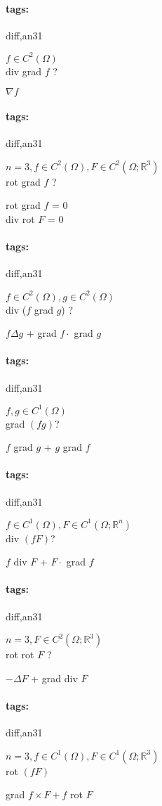 \documentclass[12pt]{article}
\newcommand*{\xfield}[1]{\begin{mdframed}\centering #1\end{mdframed}\bigskip}
\newenvironment{note}{}{}
\newcommand*{\tags}[1]{\paragraph{tags: }#1}
\begin{document}
\begin{note}
	\tags{diff,an3}1
	\xfield{$f \in C^2(\Omega)$  \\
	div grad $f$ ?}
	\xfield{$\nabla f$}
\end{note}

\begin{note}
	\tags{diff,an3}1
	\xfield{$n=3,f \in C^2(\Omega) , F \in C^2(\Omega;\mathbb{R}^3 )$ \\
	rot grad $f$ ?}
	\xfield{rot grad $f$ = 0 \\ 
	div rot $F$ = 0}
\end{note}

\begin{note}
	\tags{diff,an3}1
	\xfield{$f \in C^2(\Omega),g \in C^2(\Omega)$  \\
	div ($f$ grad $g$) ?}
	\xfield{$f\Delta g$ + grad $f \cdot$ grad $g$}
\end{note}

\begin{note}
	\tags{diff,an3}1
	\xfield{$f,g \in C^1(\Omega)$ \\
	grad $(fg)$?}
	\xfield{$f$ grad $g$ + $g$ grad $f$}
\end{note}

\begin{note}
	\tags{diff,an3}1
	\xfield{$f \in C^1(\Omega) , F \in C^1(\Omega;\mathbb{R}^n )$  \\
	div $(fF)$?}
	\xfield{$f$ div $F$ + $F \cdot$ grad $f$}
\end{note}

\begin{note}
	\tags{diff,an3}1
	\xfield{$n=3, F \in C^2(\Omega;\mathbb{R}^3 )$ \\
	rot rot $F$ ?}
	\xfield{$-\Delta F$ + grad div $F$}
\end{note}

\begin{note}
	\tags{diff,an3}1
	\xfield{$n=3, f \in C^1(\Omega) , F \in C^1(\Omega;\mathbb{R}^3)$ \\
	rot $(fF)$}
	\xfield{grad $f \times F + f$ rot $F$}
\end{note}
\end{document}
